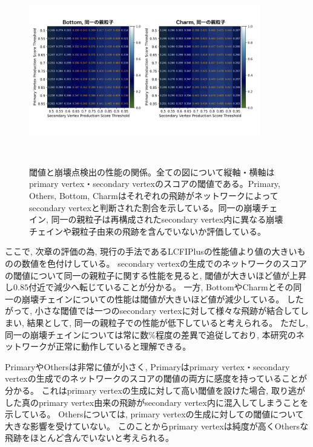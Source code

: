 \begin{figure}[htbp]
   \begin{minipage}{0.95\textwidth}
   \centering
    \includegraphics[trim = 0 140 0 125, width=0.9\textwidth, clip]{Figure/4VertexFinderwithDL/4-2-2-2SameParentParticle.png}
   \end{minipage} 
  \caption[閾値と崩壊点検出の性能の関係]{閾値と崩壊点検出の性能の関係。全ての図について縦軸・横軸はprimary vertex・secondary vertexのスコアの閾値である。Primary, Others, Bottom, Charmはそれぞれの飛跡がネットワークによってsecondary vertexと判断された割合を示している。同一の崩壊チェイン, 同一の親粒子は再構成されたsecondary vertex内に異なる崩壊チェインや親粒子由来の飛跡を含んでいないか評価している。}
  \label{4-2-2-2TrackEfficiency}
\end{figure}

ここで, 次章の評価の為, 現行の手法であるLCFIPlusの性能値より値の大きいものの数値を色付けしている。
secondary vertexの生成でのネットワークのスコアの閾値について同一の親粒子に関する性能を見ると, 閾値が大きいほど値が上昇し$0.85$付近で減少へ転じていることが分かる。
一方, BottomやCharmとその同一の崩壊チェインについての性能は閾値が大きいほど値が減少している。
したがって, 小さな閾値では一つのsecondary vertexに対して様々な飛跡が結合してしまい, 結果として, 同一の親粒子での性能が低下していると考えられる。
ただし, 同一の崩壊チェインについては常に数\%程度の差異で追従しており, 本研究のネットワークが正常に動作していると理解できる。

PrimaryやOthersは非常に値が小さく, Primaryはprimary vertex・secondary vertexの生成でのネットワークのスコアの閾値の両方に感度を持っていることが分かる。
これはprimary vertexの生成に対して高い閾値を設けた場合, 取り逃がした真のprimary vertex由来の飛跡がsecondary vertex内に混入してしまうことを示している。
Othersについては, primary vertexの生成に対しての閾値について大きな影響を受けていない。
このことからprimary vertexは純度が高くOthersな飛跡をほとんど含んでいないと考えられる。

